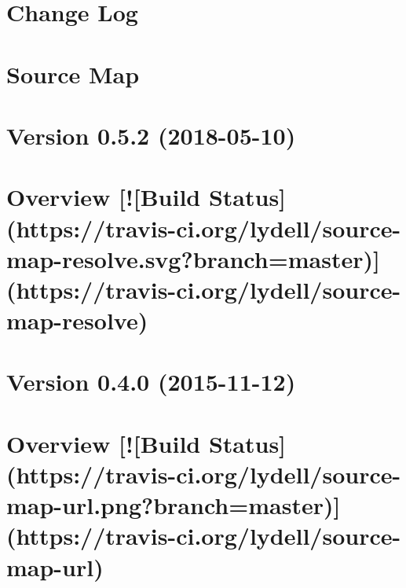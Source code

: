 \documentclass[twoside]{book}
\newcommand{\+}{\discretionary{\mbox{\scriptsize$\hookleftarrow$}}{}{}}
\begin{document}
\chapter{Change Log}
\label{md_dsmacc_vis_degree_node_modules_source-map_CHANGELOG}

\chapter{Source Map}
\label{md_dsmacc_vis_degree_node_modules_source-map_README}

\chapter{Version 0.5.2 (2018-\/05-\/10)}
\label{md_dsmacc_vis_degree_node_modules_source-map-resolve_changelog}

\chapter{Overview \mbox{[}!\mbox{[}Build Status\mbox{]}(https\+://travis-\/ci.org/lydell/source-\/map-\/resolve.svg?branch=master)\mbox{]}(https\+://travis-\/ci.org/lydell/source-\/map-\/resolve)}
\label{md_dsmacc_vis_degree_node_modules_source-map-resolve_readme}

\chapter{Version 0.4.0 (2015-\/11-\/12)}
\label{md_dsmacc_vis_degree_node_modules_source-map-url_changelog}

\chapter{Overview \mbox{[}!\mbox{[}Build Status\mbox{]}(https\+://travis-\/ci.org/lydell/source-\/map-\/url.png?branch=master)\mbox{]}(https\+://travis-\/ci.org/lydell/source-\/map-\/url)}
\label{md_dsmacc_vis_degree_node_modules_source-map-url_readme}

\end{document}
